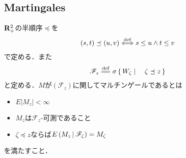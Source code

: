 \subsection{Martingales}
	$\mathbf{R}_{+}^{2}$の半順序$\preceq$を
	\begin{align}
		(s,t) \preceq (u,v) \overset{\mathrm{def}}{\Longleftrightarrow} s \leq u \wedge t \leq v
	\end{align}
	で定める．また
	\begin{align}
		\mathscr{F}_{z} \defeq \sigma\Set{W_{\zeta}}{\zeta \preceq z}
	\end{align}
	と定める．$M$が$(\mathscr{F}_{z})$に関してマルチンゲールであるとは
	\begin{itemize}
		\item $E|M_{z}| < \infty$
		\item $M_{z}$は$\mathscr{F}_{z}$-可測であること
		\item $\zeta \preceq z$ならば$E\left( M_{z} \, \middle|\, \mathscr{F}_{\zeta} \right) = M_{\zeta}$
	\end{itemize}
	を満たすこと．